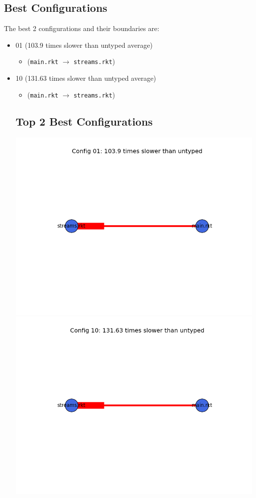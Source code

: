 \documentclass{article}
\newcommand{\mono}[1]{\texttt{#1}}
\begin{document}
\subsection{Best Configurations}
The best 2 configurations and their boundaries are:
\begin{itemize}
\item 01 (103.9 times slower than untyped average)
  \begin{itemize}
  \item (\mono{main.rkt} $\rightarrow$ \mono{streams.rkt})
  \end{itemize}
\item 10 (131.63 times slower than untyped average)
  \begin{itemize}
  \item (\mono{main.rkt} $\rightarrow$ \mono{streams.rkt})
  \end{itemize}

\subsection{Top 2 Best Configurations}
\includegraphics[width=\textwidth]{sieve-2015-04-06-module-graph-01.png}
\includegraphics[width=\textwidth]{sieve-2015-04-06-module-graph-10.png}
\end{itemize}
\end{document}
